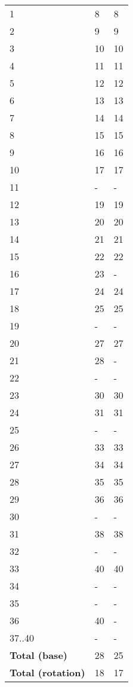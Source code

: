 \begin{center}
\begin{longtable}{|l|l|l|}
1 & 8 & 8  \\
2 & 9 & 9  \\
3 & 10 & 10  \\
4 & 11 & 11  \\
5 & 12 & 12  \\
6 & 13 & 13  \\
7 & 14 & 14  \\
8 & 15 & 15  \\
9 & 16 & 16  \\
10 & 17 & 17  \\
11 & - & - \\
12 & 19 & 19  \\
13 & 20 & 20  \\
14 & 21 & 21  \\
15 & 22 & 22  \\
16 & 23 & - \\
17 & 24 & 24  \\
18 & 25 & 25 \\
19 & - & - \\
20 & 27 & 27 \\
21 & 28 & - \\
22 & - & - \\
23 & 30 & 30 \\
24 & 31 & 31 \\
25 & - & - \\
26 & 33 & 33 \\
27 & 34 & 34 \\
28 & 35 & 35 \\
29 & 36 & 36 \\
30 & - & - \\
31 & 38 & 38 \\
32 & - & - \\
33 & 40 & 40 \\
34 & - & - \\
35 & - & - \\
36 & 40 & - \\
37..40 & - & - \\
\hline
\textbf{Total (base)} & 28 & 25 \\ 
\textbf{Total (rotation)} & 18 & 17 \\

\end{longtable}
\end{center}
